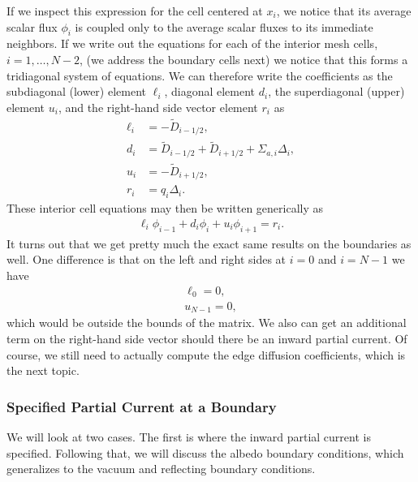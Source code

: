 If we inspect this expression for the cell centered at $x_i$, we notice that its average scalar flux $\phi_i$ is coupled only to the average scalar fluxes to its immediate neighbors. If we write out the equations for each of the interior mesh cells, $i=1, \ldots, N-2$, (we address the boundary cells next) we notice that this forms a tridiagonal system of equations. We can therefore write the coefficients as the subdiagonal (lower) element $\ell_i$, diagonal element $d_i$, the superdiagonal (upper) element $u_i$, and the right-hand side vector element $r_i$ as
\begin{subequations}
\begin{align}
  \ell_i	&= -\widetilde{D}_{i-1/2}, \\
  d_i		&=  \widetilde{D}_{i-1/2} + \widetilde{D}_{i+1/2}  + \Sigma_{a,i} \Delta_i, \\
  u_i		&= -\widetilde{D}_{i+1/2}, \\
  r_i		&=  q_i \Delta_i.
\end{align} 
\end{subequations}
These interior cell equations may then be written generically as
\begin{align}
  \ell_i \phi_{i-1} + d_i \phi_i + u_i \phi_{i+1} = r_i .
\end{align}
It turns out that we get pretty much the exact same results on the boundaries as well. One difference is that on the left and right sides at $i = 0$ and $i = N-1$ we have
\begin{subequations}
\begin{align}
  \ell_0  = 0, \\
  u_{N-1} = 0,
\end{align}
\end{subequations}
which would be outside the bounds of the matrix. We also can get an additional term on the right-hand side vector should there be an inward partial current. Of course, we still need to actually compute the edge diffusion coefficients, which is the next topic.


\subsubsection{Specified Partial Current at a Boundary}

We will look at two cases. The first is where the inward partial current is specified. Following that, we will discuss the albedo boundary conditions, which generalizes to the vacuum and reflecting boundary conditions.

